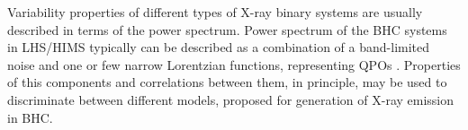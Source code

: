 \documentclass[a4paper,fleqn,usenatbib]{mnras}
\begin{document}
%
%
%

Variability properties of different types of X-ray binary systems are usually described in terms of the power spectrum.
Power spectrum of the BHC systems in LHS/HIMS typically can be described as a combination of a band-limited noise and one or few narrow Lorentzian functions, representing QPOs \citep[see, e.g.][e.t.c]{1972ApJ...174L..35T, 1990A&A...227L..33B, homan05}. 
Properties of this components and correlations between them, in principle, may be used to discriminate between different models, proposed for generation of X-ray emission in BHC. 
 
\end{document}
